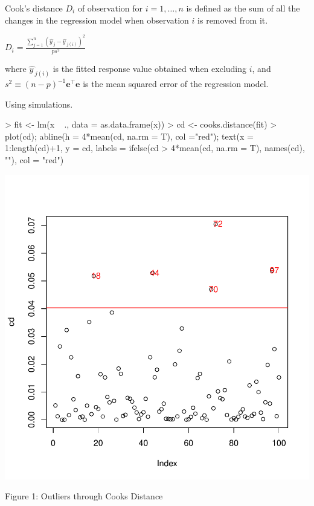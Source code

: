 \documentclass{article}
\begin{document}
Cook's distance $D_{i}$ of observation for $i=1,\dots ,n$ is defined as the sum of all the changes in the regression model when observation $i$ is removed from it.

\begin{center}
$D_{i}={\frac {\sum _{j=1}^{n}\left({\widehat {y\,}}_{j}-{\widehat {y\,}}_{j(i)}\right)^{2}}{ps^{2}}}$
\end{center}

where ${\widehat {y\,}}_{j(i)}$ is the fitted response value obtained when excluding $i$, and ${\displaystyle s^{2}\equiv \left(n-p\right)^{-1}\mathbf {e} ^{\top }\mathbf {e} }$ is the mean squared error of the regression model.
 
Using simulations. 

{
\begin{Schunk}
\begin{Sinput}
> fit <- lm(x ~ ., data = as.data.frame(x))
> cd <- cooks.distance(fit)
> plot(cd); abline(h = 4*mean(cd, na.rm = T), col ="red"); text(x = 1:length(cd)+1, y = cd, labels = ifelse(cd > 4*mean(cd, na.rm = T), names(cd), ""), col = "red")
\end{Sinput}
\end{Schunk}
\includegraphics{anadetect-015}
\\
\begin{center}
Figure 1: Outliers through Cooks Distance
\end{center}

}
\end{document}
